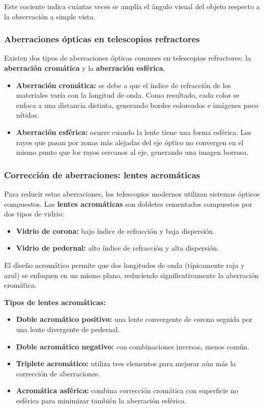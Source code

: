 Este cociente indica cuántas veces se amplía el ángulo visual del objeto respecto a la observación a simple vista.

\subsubsection*{Aberraciones ópticas en telescopios refractores}

Existen dos tipos de aberraciones ópticas comunes en telescopios refractores: la \textbf{aberración cromática} y la \textbf{aberración esférica}.

\begin{itemize}
	\item \textbf{Aberración cromática:} se debe a que el índice de refracción de los materiales varía con la longitud de onda. Como resultado, cada color se enfoca a una distancia distinta, generando bordes coloreados e imágenes poco nítidas.
	
	\item \textbf{Aberración esférica:} ocurre cuando la lente tiene una forma esférica. Los rayos que pasan por zonas más alejadas del eje óptico no convergen en el mismo punto que los rayos cercanos al eje, generando una imagen borrosa.
\end{itemize}

\subsubsection*{Corrección de aberraciones: lentes acromáticas}

Para reducir estas aberraciones, los telescopios modernos utilizan sistemas ópticos compuestos. Las \textbf{lentes acromáticas} son dobletes cementados compuestos por dos tipos de vidrio:

\begin{itemize}
	\item \textbf{Vidrio de corona:} bajo índice de refracción y baja dispersión.
	\item \textbf{Vidrio de pedernal:} alto índice de refracción y alta dispersión.
\end{itemize}

El diseño acromático permite que dos longitudes de onda (típicamente roja y azul) se enfoquen en un mismo plano, reduciendo significativamente la aberración cromática.

\textbf{Tipos de lentes acromáticas:}
\begin{itemize}
	\item \textbf{Doble acromático positivo:} una lente convergente de corona seguida por una lente divergente de pedernal.
	\item \textbf{Doble acromático negativo:} con combinaciones inversas, menos común.
	\item \textbf{Triplete acromático:} utiliza tres elementos para mejorar aún más la corrección de aberraciones.
	\item \textbf{Acromática asférica:} combina corrección cromática con superficie no esférica para minimizar también la aberración esférica.
\end{itemize}

